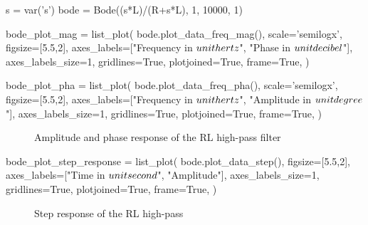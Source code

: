 \begin{sagesilent}
    s = var('s')
    bode = Bode((s*L)/(R+s*L), 1, 10000, 1)

    bode_plot_mag = list_plot(
        bode.plot_data_freq_mag(),
        scale='semilogx',
        figsize=[5.5,2],
        axes_labels=["Frequency in $\\unit{\\hertz}$", "Phase in $\\unit{\\decibel}$"],
        axes_labels_size=1,
        gridlines=True,
        plotjoined=True,
        frame=True,
    )

    bode_plot_pha = list_plot(
        bode.plot_data_freq_pha(),
        scale='semilogx',
        figsize=[5.5,2],
        axes_labels=["Frequency in $\\unit{\\hertz}$", "Amplitude in $\\unit{\\degree}$"],
        axes_labels_size=1,
        gridlines=True,
        plotjoined=True,
        frame=True,
    )
\end{sagesilent}

\begin{figure}[H]
    \centering
    \begin{subfigure}{\textwidth}
        \centering
    \end{subfigure}
    \quad
    \begin{subfigure}{\textwidth}
        \centering
    \end{subfigure}
    \caption{Amplitude and phase response of the RL high-pass filter}
\end{figure}

\begin{sagesilent}
    bode_plot_step_response = list_plot(
        bode.plot_data_step(),
        figsize=[5.5,2],
        axes_labels=["Time in $\\unit{\\second}$", "Amplitude"],
        axes_labels_size=1,
        gridlines=True,
        plotjoined=True,
        frame=True,
    )
\end{sagesilent}

\begin{figure}[H]
    \centering
    \caption{Step response of the RL high-pass}
\end{figure}

